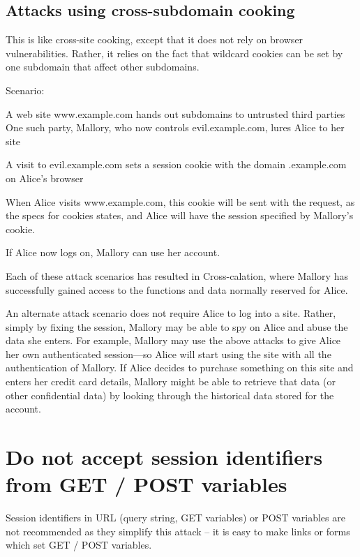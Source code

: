 \subsection{Attacks using cross-subdomain cooking}


This is like cross-site cooking, except that it does not rely on browser vulnerabilities. Rather, it relies on the fact that wildcard cookies can be set by one subdomain that affect other subdomains.

Scenario:

\begin{compactenum}
\item A web site www.example.com hands out subdomains to untrusted third parties
One such party, Mallory, who now controls evil.example.com, lures Alice to her site
\item A visit to evil.example.com sets a session cookie with the domain .example.com on Alice's browser
\item When Alice visits www.example.com, this cookie will be sent with the request, as the specs for cookies states, and Alice will have the session specified by Mallory's cookie.
\item If Alice now logs on, Mallory can use her account.
\end{compactenum}


Each of these attack scenarios has resulted in Cross-calation, where Mallory has successfully gained access to the functions and data normally reserved for Alice.

An alternate attack scenario does not require Alice to log into a site. Rather, simply by fixing the session, Mallory may be able to spy on Alice and abuse the data she enters. For example, Mallory may use the above attacks to give Alice her own authenticated session—so Alice will start using the site with all the authentication of Mallory. If Alice decides to purchase something on this site and enters her credit card details, Mallory might be able to retrieve that data (or other confidential data) by looking through the historical data stored for the account.








\section{Do not accept session identifiers from GET / POST variables}

Session identifiers in URL (query string, GET variables) or POST variables are not recommended as they simplify this attack – it is easy to make links or forms which set GET / POST variables.

